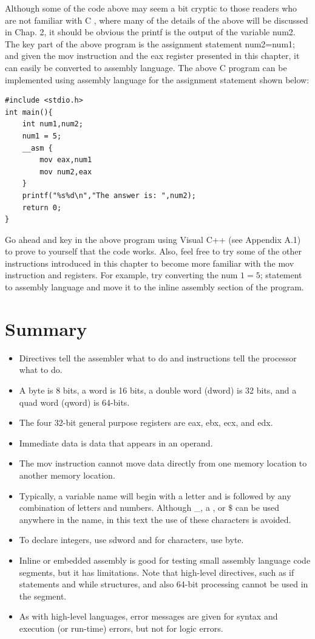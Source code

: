 \documentclass[10pt]{book}
\begin{document}
Although some of the code above may seem a bit cryptic to those readers who are not familiar with C , where many of the details of the above will be discussed in Chap. 2, it should be obvious the printf is the output of the variable num2. The key part of the above program is the assignment statement num2=num1; and given the mov instruction and the eax register presented in this chapter, it can easily be converted to assembly language. The above C program can be implemented using assembly language for the assignment statement shown below:

\begin{verbatim}
#include <stdio.h>
int main(){
    int num1,num2;
    num1 = 5;
    __asm {
        mov eax,num1
        mov num2,eax
    }
    printf("%s%d\n","The answer is: ",num2);
    return 0;
}
\end{verbatim}

Go ahead and key in the above program using Visual C++ (see Appendix A.1) to prove to yourself that the code works. Also, feel free to try some of the other instructions introduced in this chapter to become more familiar with the mov instruction and registers. For example, try converting the num $1=5$; statement to assembly language and move it to the inline assembly section of the program.

\section{Summary}
\begin{itemize}
  \item Directives tell the assembler what to do and instructions tell the processor what to do.
  \item A byte is 8 bits, a word is 16 bits, a double word (dword) is 32 bits, and a quad word (qword) is 64-bits.
  \item The four 32-bit general purpose registers are eax, ebx, ecx, and edx.
  \item Immediate data is data that appears in an operand.
  \item The mov instruction cannot move data directly from one memory location to another memory location.
  \item Typically, a variable name will begin with a letter and is followed by any combination of letters and numbers. Although \_, a , or $\$$ can be used anywhere in the name, in this text the use of these characters is avoided.
  \item To declare integers, use sdword and for characters, use byte.
  \item Inline or embedded assembly is good for testing small assembly language code segments, but it has limitations. Note that high-level directives, such as if statements and while structures, and also 64-bit processing cannot be used in the segment.
  \item As with high-level languages, error messages are given for syntax and execution (or run-time) errors, but not for logic errors.
\end{itemize}
\end{document}
